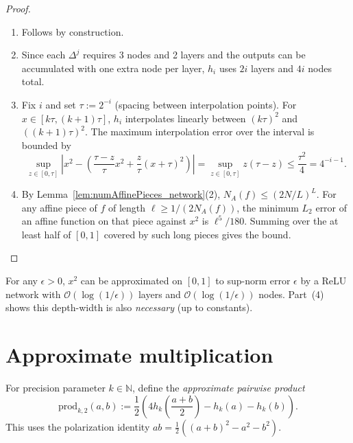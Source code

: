 \begin{proof}
  \begin{enumerate}
    \item Follows by construction.
    \item Since each $\Delta^j$ requires 3 nodes and 2 layers and the outputs can be accumulated
      with one extra node per layer, $h_i$ uses $2i$ layers and $4i$ nodes total.
    \item Fix $i$ and set $\tau := 2^{-i}$ (spacing between interpolation points).
      For $x \in [k\tau, (k+1)\tau]$, $h_i$ interpolates linearly between $(k\tau)^2$ and $((k+1)\tau)^2$.
      The maximum interpolation error over the interval is bounded by
      \[
        \sup_{z \in [0,\tau]} \left|x^2 - \left(\frac{\tau-z}{\tau}x^2 + \frac{z}{\tau}(x+\tau)^2\right)\right|
        = \sup_{z \in [0,\tau]} z(\tau - z) \leq \frac{\tau^2}{4} = 4^{-i-1}.
      \]
    \item By Lemma~\ref{lem:numAffinePieces_network}(2), $N_A(f) \leq (2N/L)^L$.
      For any affine piece of $f$ of length $\ell \geq 1/(2N_A(f))$, the minimum $L_2$ error of
      an affine function on that piece against $x^2$ is $\ell^5/180$.
      Summing over the at least half of $[0,1]$ covered by such long pieces gives the bound.
  \end{enumerate}
\end{proof}

\begin{corollary}\label{cor:squareApprox_log}
For any $\epsilon > 0$, $x^2$ can be approximated on $[0,1]$ to sup-norm error $\epsilon$
by a ReLU network with $\mathcal{O}(\log(1/\epsilon))$ layers and $\mathcal{O}(\log(1/\epsilon))$ nodes.
Part~(4) shows this depth-width is also \emph{necessary} (up to constants).
\end{corollary}

\section{Approximate multiplication}\label{sec:products}

\begin{definition}\label{def:approxProd2}
For precision parameter $k \in \mathbb{N}$, define the \emph{approximate pairwise product}
\[
  \mathrm{prod}_{k,2}(a, b) := \frac{1}{2}\left(4 h_k\!\left(\frac{a+b}{2}\right) - h_k(a) - h_k(b)\right).
\]
This uses the polarization identity $ab = \frac{1}{2}((a+b)^2 - a^2 - b^2)$.
\end{definition}

